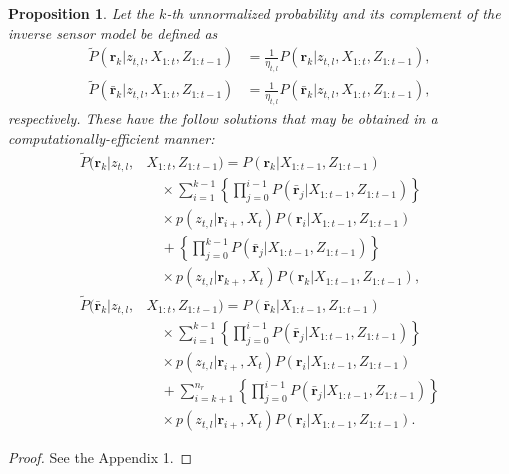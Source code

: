 \documentclass[letterpaper, 10pt, conference]{ieeeconf}
\newtheorem{prop}{Proposition}
\begin{document}
\begin{prop}
Let the $k$-th unnormalized probability and its complement of the inverse sensor model be defined as
\begin{align}
\label{eqn:Unnormalized}
\tilde P(\mathbf{r}_k|z_{t,l},X_{1:t},Z_{1:t-1})&=\frac1{\eta_{t,l}}P(\mathbf{r}_k|z_{t,l},X_{1:t},Z_{1:t-1}),
\\
\label{eqn:UnnormalizedCompl}
\tilde P(\bar{\mathbf{r}}_k|z_{t,l},X_{1:t},Z_{1:t-1})&=\frac1{\eta_{t,l}}P(\bar{\mathbf{r}}_k|z_{t,l},X_{1:t},Z_{1:t-1}),
\end{align}
respectively.
These have the follow solutions that may be obtained in a computationally-efficient manner:
\begin{align}
\label{eqn:tildePresult}
\tilde P(\mathbf{r}_k|z_{t,l},&X_{1:t},Z_{1:t-1})=P(\mathbf{r}_k|X_{1:t-1},Z_{1:t-1})\nonumber\\
&\quad\times \sum_{i=1}^{k-1}\left\{\prod_{j=0}^{i-1}P(\bar{\mathbf{r}}_j|X_{1:t-1},Z_{1:t-1})\right\}\nonumber\\
&\quad\times p(z_{t,l}|\mathbf{r}_{i+},X_t)P(\mathbf{r}_i|X_{1:t-1},Z_{1:t-1})
\nonumber
\\
&\quad
+
\left\{\prod_{j=0}^{k-1}P(\bar{\mathbf{r}}_j|X_{1:t-1},Z_{1:t-1})\right\}\nonumber\\
&\quad\times p(z_{t,l}|\mathbf{r}_{k+},X_t)P(\mathbf{r}_k|X_{1:t-1},Z_{1:t-1}),
\\
\label{eqn:tildePcomplementresult}
\tilde P(\bar{\mathbf{r}}_k|z_{t,l},&X_{1:t},Z_{1:t-1})
=P(\bar{\mathbf{r}}_k|X_{1:t-1},Z_{1:t-1})\nonumber\\
&\quad\times \sum_{i=1}^{k-1}\left\{\prod_{j=0}^{i-1}P(\bar{\mathbf{r}}_j|X_{1:t-1},Z_{1:t-1})\right\}\nonumber\\
&\quad\times p(z_{t,l}|\mathbf{r}_{i+},X_t)P(\mathbf{r}_i|X_{1:t-1},Z_{1:t-1})
\nonumber
\\
&\quad
+
\sum_{i=k+1}^{n_r}\left\{\prod_{j=0}^{i-1}P(\bar{\mathbf{r}}_j|X_{1:t-1},Z_{1:t-1})\right\}\nonumber\\
&\quad\times p(z_{t,l}|\mathbf{r}_{i+},X_t)P(\mathbf{r}_i|X_{1:t-1},Z_{1:t-1}).
\end{align}
\end{prop}
\begin{proof}
See the Appendix 1.
\end{proof}
\end{document}
